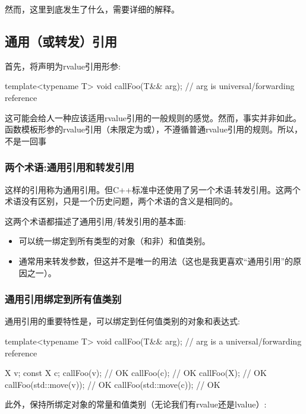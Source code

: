 然而，这里到底发生了什么，需要详细的解释。

\subsection{通用（或转发）引用}

首先，将声明为rvalue引用形参:

\begin{cppcode}
template<typename T>
void callFoo(T&& arg); // arg is universal/forwarding reference
\end{cppcode}

这可能会给人一种应该适用rvalue引用的一般规则的感觉。然而，事实并非如此。函数模板形参的rvalue引用（未限定为或），不遵循普通rvalue引用的规则。所以，不是一回事

\subsubsection{两个术语:通用引用和转发引用}

这样的引用称为通用引用。但C++标准中还使用了另一个术语:转发引用。这两个术语没有区别，只是一个历史问题，两个术语的含义是相同的。

这两个术语都描述了通用引用/转发引用的基本面:

\begin{itemize}
	\item 可以统一绑定到所有类型的对象（和非）和值类别。
	\item 通常用来转发参数，但这并不是唯一的用法（这也是我更喜欢“通用引用”的原因之一）。
\end{itemize}

\subsubsection{通用引用绑定到所有值类别}

通用引用的重要特性是，可以绑定到任何值类别的对象和表达式:

\begin{cppcode}
template<typename T>
void callFoo(T&& arg); // arg is a universal/forwarding reference

X v;
const X c;
callFoo(v); // OK
callFoo(c); // OK
callFoo(X{}); // OK
callFoo(std::move(v)); // OK
callFoo(std::move(c)); // OK
\end{cppcode}

此外，保持所绑定对象的常量和值类别（无论我们有rvalue还是lvalue）:

